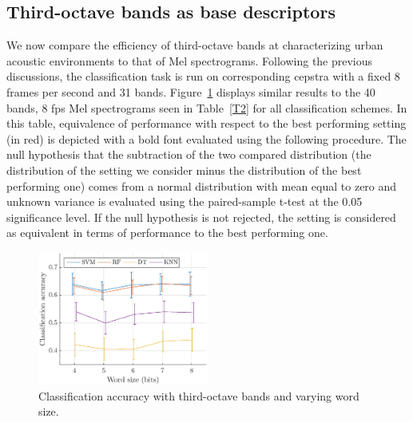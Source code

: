 \documentclass[sensors,article,submit,moreauthors,pdftex,10pt,a4paper]{mdpi}
\begin{document}
\subsection{Third-octave bands as base descriptors}

We now compare the efficiency of third-octave bands at characterizing urban acoustic environments to that of Mel spectrograms. Following the previous discussions, the classification task is run on corresponding cepstra with a fixed 8 frames per second and 31 bands. Figure~\ref{fig:class_tob_q} displays similar results to the 40 bands, 8 fps Mel spectrograms seen in Table~\ref{T2} for all classification schemes. In this table, equivalence of performance with respect to the best performing setting (in red) is depicted with a bold font evaluated using the following procedure. The null hypothesis that the subtraction of the two compared distribution (the distribution of the setting we consider minus the distribution of the best performing one) comes from a normal distribution with mean equal to zero and unknown variance is evaluated using the paired-sample t-test at the 0.05 significance level. If the null hypothesis is not rejected, the setting is considered as equivalent in terms of performance to the best performing one. \\

\begin{figure}[htbp]
	\centering
		\includegraphics[width=0.5\textwidth]{figures/class_tob_q.eps}
	\caption{Classification accuracy with third-octave bands and varying word size.}
	\label{fig:class_tob_q}
\end{figure}
\end{document}
